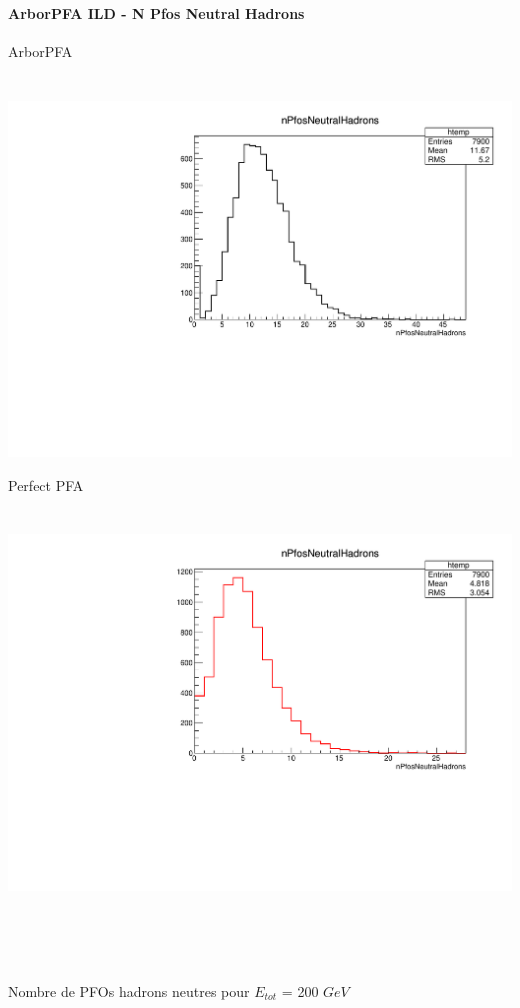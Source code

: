 \documentclass[8pt]{beamer}
\begin{document}
  \begin{frame}
  \frametitle{\backup}
  \framesubtitle{ArborPFA ILD - N Pfos Neutral Hadrons}
    \begin{minipage}{0.48\linewidth}
      \begin{center}
        ArborPFA \\
        ~ \\
        ~~~~~\includegraphics[width=\linewidth]{nPfosNeutralHadrons_ArborPFA.pdf}
      \end{center}
    \end{minipage}
    \begin{minipage}{0.48\linewidth}
      \begin{center}
        Perfect PFA \\
        ~ \\
        ~~~~~\includegraphics[width=\linewidth]{nPfosNeutralHadrons_PerfectPFA.pdf}
      \end{center}
    \end{minipage}
    ~ \\
    ~ \\
    ~ \\
    \begin{center} Nombre de PFOs hadrons neutres pour $E_{tot}$ = 200 $GeV$ \end{center}
  \end{frame}
\end{document}
